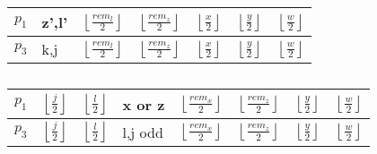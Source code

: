 \documentclass{article}
\newcommand{\floor}[3][2]{\left \lfloor\frac{#2}{#3}\right \rfloor}
\begin{document}
\begin{table}[h]
    \centering
    \begin{tabular}{|l|l|l|l|l|l|l|}
        \hline
        $p_1$ & z',l' & $\floor{rem_l}{2}$ & $\floor{rem_z}{2}$ & $\floor{x}{2}$ & $\floor{y}{2}$ & $\floor{w}{2}$ \\ \hline
        $p_3$ & k,j & $\floor{rem_l}{2}$ & $\floor{rem_z}{2}$ & $\floor{x}{2}$ & $\floor{y}{2}$ & $\floor{w}{2}$ \\ \hline
    \end{tabular}
    \caption{}
    \label{table:abb-abb-bbb-y>0-l<x+y+j+k-x>=0-change-assignment}
\end{table}
\begin{table}[h]
    \centering
    \begin{tabular}{|l|l|l|l|l|l|l|l|}
    \hline
    $p_1$ & $\floor{j}{2}$ & $\floor{l}{2}$ & x or z  & $\floor{rem_x}{2}$ & $\floor{rem_z}{2}$ & $\floor{y}{2}$ & $\floor{w}{2}$ \\ \hline
    $p_3$ & $\floor{j}{2}$ & $\floor{l}{2}$ & l,j odd & $\floor{rem_x}{2}$ & $\floor{rem_z}{2}$ & $\floor{y}{2}$ & $\floor{w}{2}$ \\ \hline
    \end{tabular}
    \caption{}
    \label{table:abb-abb-abb-y>0-l>x+y+j+k-x-z>0}
\end{table}
\end{document}
